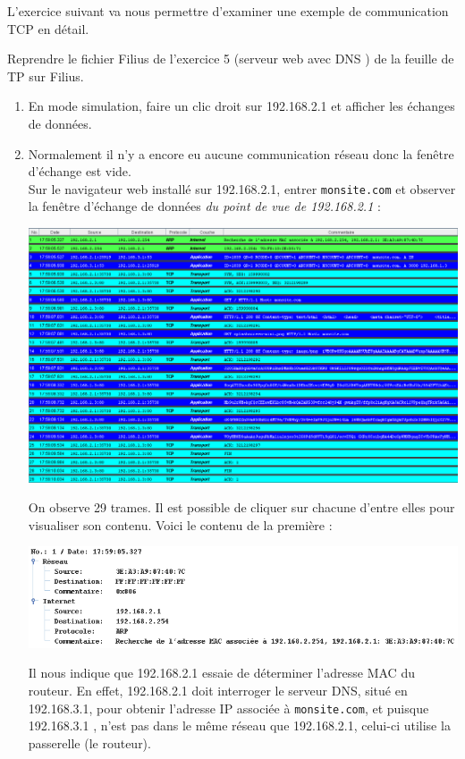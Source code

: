 L'exercice suivant va nous permettre d'examiner une exemple de communication TCP en détail.

\begin{exercice}[]
    Reprendre le fichier Filius de l'exercice 5 (serveur web avec DNS ) de la feuille de TP sur Filius.
    \begin{enumerate}
        \item 	En mode simulation, faire un clic droit sur 192.168.2.1 et afficher les échanges de données.
        \item	Normalement il n'y a encore eu aucune communication réseau donc la fenêtre d'échange est vide.\\
              Sur le navigateur web installé sur 192.168.2.1, entrer \texttt{monsite.com} et observer la fenêtre d'échange de données \textit{du point de vue de 192.168.2.1} :
              \begin{center}
                  \includegraphics[width=\linewidth]{ch-transmissions/img/echange_donnees.png}
              \end{center}
              On observe 29 trames. Il est possible de cliquer sur chacune d'entre elles pour visualiser son contenu. Voici le contenu de la première :
              \begin{center}
                  \includegraphics[width=\linewidth]{ch-transmissions/img/trame_1.png}
              \end{center}
              Il nous indique que 192.168.2.1 essaie de déterminer l'adresse MAC du routeur. En effet, 192.168.2.1 doit interroger le serveur DNS, situé en 192.168.3.1, pour obtenir l'adresse IP associée à \texttt{monsite.com}, et puisque 192.168.3.1 , n'est pas dans le même réseau que 192.168.2.1, celui-ci utilise la passerelle (le routeur).\\

\end{enumerate}
\end{exercice}

